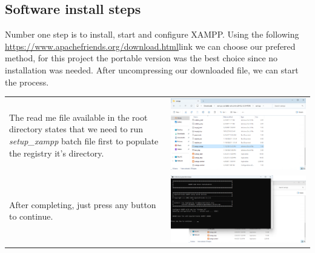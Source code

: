 \documentclass[11pt,a4paper]{report}
\begin{document}
    \subsection{Software install steps}
        Number one step is to install, start and configure XAMPP. Using the following \url{https://www.apachefriends.org/download.html}{link} we can choose our prefered
        method, for this project the portable version was the best choice since no installation was needed.
        After uncompressing our downloaded file, we can start the process.
        \begin{tabular}{ l r }
            The read me file available in the root directory states that
            we need to run \textit{setup\_xampp} batch file first to populate the
            registry it's directory.                                        & \includegraphics[scale=0.3]{install_xampp08} \\ %

            After completing, just press any button to continue.            & \includegraphics[scale=0.3]{install_xampp09} \\


\end{tabular}
\end{document}
